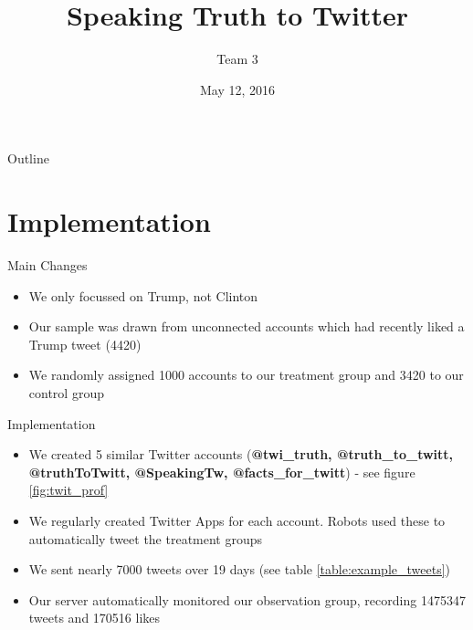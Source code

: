 \documentclass[10pt]{beamer}\usepackage[]{graphicx}\usepackage[]{color}
\title[RCT Findings]{Speaking Truth to Twitter}
\author{Team 3}
\institute[HSOG]{Hertie School of Governance}
\date{May 12, 2016}
\begin{document}
\begin{frame}
  \titlepage
\end{frame}

\begin{frame}{Outline}
  \tableofcontents
\end{frame}






\section{Implementation}
\begin{frame} {Main Changes}
	\begin{itemize}
	\item We only focussed on Trump, not Clinton
	\item Our sample was drawn from unconnected accounts which had recently liked a Trump tweet (4420)
	\item We randomly assigned 1000 accounts to our treatment group and 3420 to our control group
	\end{itemize}
\end{frame}

\begin{frame}{Implementation}
	\begin{itemize}
	\item We created \num{5} similar Twitter accounts %
	(\textbf{@twi\_truth, @truth\_to\_twitt, @truthToTwitt, @SpeakingTw, @facts\_for\_twitt}) - see figure  \ref{fig:twit_prof}
	\item We regularly created Twitter Apps for each account. Robots used these to automatically tweet the treatment groups
	\item We sent nearly \num{7000} tweets over \num{19} days (see table \ref{table:example_tweets})
	\item Our server automatically monitored our observation group, recording \num{1475347} tweets and \num{170516} likes
	\end{itemize}
\end{frame}
\end{document}
